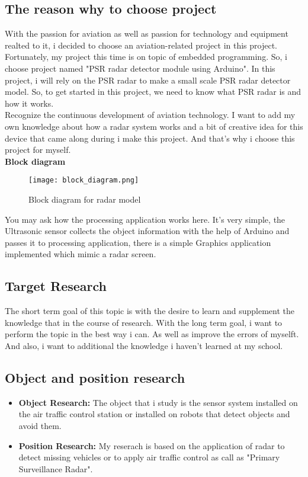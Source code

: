\documentclass[13pt,a4paper]{report}
\begin{document}
    \subsection{The reason why to choose project}
        With the passion for aviation as well as passion for technology and equipment realted to 
        it, i decided to choose an aviation-related project in this project. Fortunately, my project 
        this time is on topic of embedded programming. So, i choose project named "PSR radar 
        detector module using Arduino". In this project, i will rely 
        on the PSR radar to make a small scale PSR radar detector model. So, to get 
        started in this project, we need to know what PSR radar is and how it works. \\
    \vspace{5mm}
        Recognize the continuous development of aviation technology. I want to add my own 
        knowledge about how a radar system works and a bit of creative idea for this device 
        that came along during i make this project. And that's why i choose this project for myself. \\
    \vspace{5mm}
    \textbf{Block diagram}
    \begin{figure}[ht]
        \centering
        \texttt{[image: block\_diagram.png]}
        \caption{\label{fig:pic}Block diagram for radar model}
    \end{figure}
    \linebreak
    \par You may ask how the processing application works here. It's very simple, the 
    Ultrasonic sensor collects the object information with the help of Arduino and passes 
    it to processing application, there is a simple Graphics application implemented which 
    mimic a radar screen.
    \subsection{Target Research}
        The short term goal of this topic is with the desire to learn and supplement the 
        knowledge that in the course of research. With the long term goal, i want to perform 
        the topic in the best way i can. As well as improve the errors of myselft. And also, 
        i want to additional the knowledge i haven't learned at my school.
    \subsection{Object and position research}
    \vspace{3mm}
        \begin{itemize}
            \item \textbf{Object Research:} The object that i study is the sensor system 
        installed on the air traffic control station or installed on robots that detect 
        objects and avoid them.
            \item \textbf{Position Research:} My reserach is based on the application of radar 
        to detect missing vehicles or to apply air traffic control as call as "Primary Surveillance Radar".
        \end{itemize} 
\end{document}
